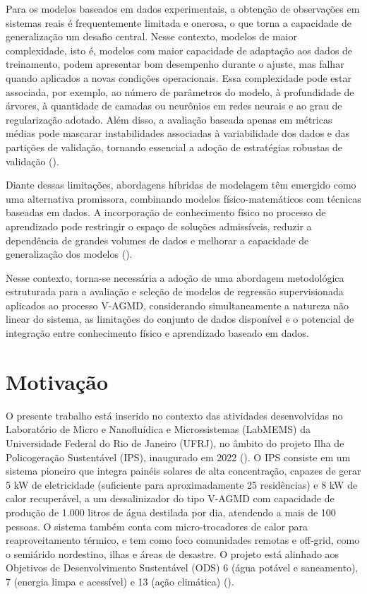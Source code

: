 Para os modelos baseados em dados experimentais, a obtenção de observações em sistemas reais é frequentemente limitada e onerosa, o que torna a capacidade de generalização um desafio central. Nesse contexto, modelos de maior complexidade, isto é, modelos com maior capacidade de adaptação aos dados de treinamento, podem apresentar bom desempenho durante o ajuste, mas falhar quando aplicados a novas condições operacionais. Essa complexidade pode estar associada, por exemplo, ao número de parâmetros do modelo, à profundidade de árvores, à quantidade de camadas ou neurônios em redes neurais e ao grau de regularização adotado. Além disso, a avaliação baseada apenas em métricas médias pode mascarar instabilidades associadas à variabilidade dos dados e das partições de validação, tornando essencial a adoção de estratégias robustas de validação (\cite{Vabalas2019,Yip2019,Roberts2017,Kirk2024}).

Diante dessas limitações, abordagens híbridas de modelagem têm emergido como uma alternativa promissora, combinando modelos físico-matemáticos com técnicas baseadas em dados. A incorporação de conhecimento físico no processo de aprendizado pode restringir o espaço de soluções admissíveis, reduzir a dependência de grandes volumes de dados e melhorar a capacidade de generalização dos modelos (\cite{Xu2022,Muther2022,Kasilingam2024}).

Nesse contexto, torna-se necessária a adoção de uma abordagem metodológica estruturada para a avaliação e seleção de modelos de regressão supervisionada aplicados ao processo V-AGMD, considerando simultaneamente a natureza não linear do sistema, as limitações do conjunto de dados disponível e o potencial de integração entre conhecimento físico e aprendizado baseado em dados.

\section{Motivação}

O presente trabalho está inserido no contexto das atividades desenvolvidas no Laboratório de Micro e Nanofluídica e Microssistemas (LabMEMS) da Universidade Federal do Rio de Janeiro (UFRJ), no âmbito do projeto Ilha de Policogeração Sustentável (IPS), inaugurado em 2022 (\cite{COPPS2022}). O IPS consiste em um sistema pioneiro que integra painéis solares de alta concentração, capazes de gerar 5 kW de eletricidade (suficiente para aproximadamente 25 residências) e 8 kW de calor recuperável, a um dessalinizador do tipo V-AGMD com capacidade de produção de 1.000 litros de água destilada por dia, atendendo a mais de 100 pessoas. O sistema também conta com micro-trocadores de calor para reaproveitamento térmico, e tem como foco comunidades remotas e off-grid, como o semiárido nordestino, ilhas e áreas de desastre. O projeto está alinhado aos Objetivos de Desenvolvimento Sustentável (ODS) 6 (água potável e saneamento), 7 (energia limpa e acessível) e 13 (ação climática) (\cite{COPPS2022,UNSDG6}).

